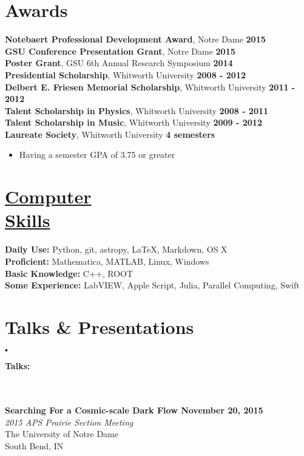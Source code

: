\documentclass[margin]{res}
\begin{document}
\begin{resume}
\section{Awards}
{\bf Notebaert Professional Development Award}, Notre Dame  \hfill {\bf 2015}  \\
{\bf GSU Conference Presentation Grant}, Notre Dame  \hfill {\bf 2015}  \\
{\bf Poster Grant}, GSU 6th Annual Research Symposium \hfill {\bf 2014}  \\
{\bf Presidential Scholarship}, Whitworth University \hfill {\bf2008 - 2012} \\
{\bf Delbert E. Friesen Memorial Scholarship}, Whitworth University \hfill {\bf2011 - 2012} \\
{\bf Talent Scholarship in Physics}, Whitworth University \hfill {\bf2008 - 2011} \\
{\bf Talent Scholarship in Music}, Whitworth University \hfill {\bf2009 - 2012} \\
{\bf Laureate Society}, Whitworth University \hfill {\bf4 semesters}
\begin{itemize}  \itemsep -2pt %
     \item Having a semester GPA of 3.75 or greater
\end{itemize}








\section{\href{https://github.com/brose3}{Computer \\Skills}}
{\bf Daily Use:} Python, git, astropy, \LaTeX, Markdown, OS X \\
{\bf Proficient:} Mathematica, MATLAB, Linux, Windows \\
{\bf Basic Knowledge:} C++, ROOT\\
{\bf Some Experience:} LabVIEW, Apple Script, Julia, Parallel Computing, Swift \\






\section{Talks \& Presentations}

 $_{•}    $\\\centerline{\bf Talks:} \\ \\
{\bf Searching For a Cosmic-scale Dark Flow \hfill November 20, 2015} \\
{\sl 2015 APS Prairie Section Meeting} \\
The University of Notre Dame \\
South Bend, IN



\end{resume}
\end{document}
